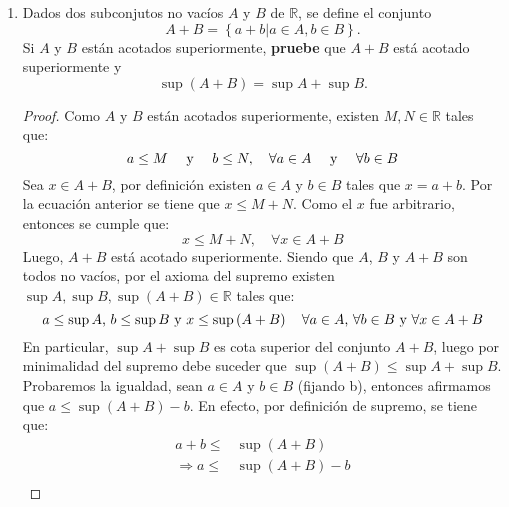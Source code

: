 \documentclass[12pt]{article}
\begin{document}
\begin{enumerate}
\begin{proof}
        \begin{equation*}
            \sup A \leq \inf B
        \end{equation*}
        \qed
    \end{proof}
    \item Dados dos subconjutos no vacíos $A$ y $B$ de $\mathbb{R}$, se define el conjunto
    \begin{equation*}
        A+B=\left\{ a+b|a\in A, b\in B\right\}.
    \end{equation*}
    Si $A$ y $B$ están acotados superiormente, \textbf{pruebe} que $A+B$ está acotado superiormente y
    \begin{equation*}
        \sup \left(A+B\right)=\sup A +\sup B.
    \end{equation*}
    \begin{proof}
        Como $A$ y $B$ están acotados superiormente, existen $M,N\in\mathbb{R}$ tales que:
        \begin{equation*}
            a\leq M \quad \textup{ y } \quad b\leq N, \quad \forall a\in A \quad \textup{ y } \quad \forall b\in B
        \end{equation*}
        Sea $x\in A+B$, por definición existen $a\in A$ y $b\in B$ tales que $x=a+b$. Por la ecuación anterior se tiene que $x\leq M+N$. Como el $x$ fue arbitrario, entonces se cumple que:
        \begin{equation*}
            x\leq M+N,\quad \forall x\in A+B
        \end{equation*}
        Luego, $A+B$ está acotado superiormente. Siendo que $A$, $B$ y $A+B$ son todos no vacíos, por el axioma del supremo existen $\sup A, \sup B, \sup (A+B)\in\mathbb{R}$ tales que:
        \begin{equation*}
            a\leq \sup A \textup{, } b\leq \sup B \textup{ y } x\leq \sup \left(A+B\right) \quad \forall a\in A \textup{, } \forall b\in B \textup{ y }\forall x\in A+B
        \end{equation*}
        En particular, $\sup A + \sup B$ es cota superior del conjunto $A+B$, luego por minimalidad del supremo debe suceder que $\sup (A+B)\leq \sup A + \sup B$. Probaremos la igualdad, sean $a\in A$ y $b\in B$ (fijando b), entonces afirmamos que $a\leq \sup (A+B)-b$. En efecto, por definición de supremo, se tiene que:
        \begin{equation*}
            \begin{split}
                a+b\leq& \sup (A+B)\\
                \Rightarrow a \leq& \sup(A+B)-b\\

\end{split}
\end{equation*}
\end{proof}
\end{enumerate}
\end{document}
